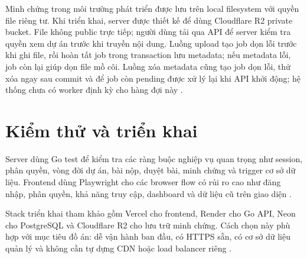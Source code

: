 Minh chứng trong môi trường phát triển được lưu trên local filesystem với quyền file riêng tư. Khi triển khai, server được thiết kế để dùng Cloudflare R2 private bucket. File không public trực tiếp; người dùng tải qua API để server kiểm tra quyền xem dự án trước khi truyền nội dung. Luồng upload tạo job dọn lỗi trước khi ghi file, rồi hoàn tất job trong transaction lưu metadata; nếu metadata lỗi, job còn lại giúp dọn file mồ côi. Luồng xóa metadata cũng tạo job dọn lỗi, thử xóa ngay sau commit và để job còn pending được xử lý lại khi API khởi động; hệ thống chưa có worker định kỳ cho hàng đợi này \cite{cloudflarer2}.

\section{Kiểm thử và triển khai}

Server dùng Go test để kiểm tra các ràng buộc nghiệp vụ quan trọng như session, phân quyền, vòng đời dự án, bài nộp, duyệt bài, minh chứng và trigger cơ sở dữ liệu. Frontend dùng Playwright cho các browser flow có rủi ro cao như đăng nhập, phân quyền, khả năng truy cập, dashboard và dữ liệu cũ trên giao diện \cite{playwright}.

Stack triển khai tham khảo gồm Vercel cho frontend, Render cho Go API, Neon cho PostgreSQL và Cloudflare R2 cho lưu trữ minh chứng. Cách chọn này phù hợp với mục tiêu đồ án: dễ vận hành ban đầu, có HTTPS sẵn, có cơ sở dữ liệu quản lý và không cần tự dựng CDN hoặc load balancer riêng \cite{vercel,render,neon,cloudflarer2}.

